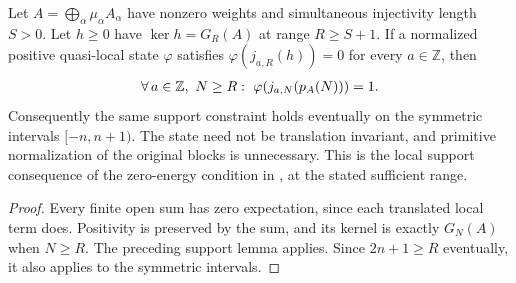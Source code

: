 \begin{lemma}
    \label{thm:quasi_local_parent_zero_energy_joint_support}
    \leanok
    Let $A=\bigoplus_\alpha\mu_\alpha A_\alpha$ have nonzero weights and
    simultaneous injectivity length $S>0$. Let $h\geq0$ have
    $\ker h=G_R(A)$ at range $R\geq S+1$.
    If a normalized positive quasi-local state $\varphi$ satisfies
    $\varphi(j_{a,R}(h))=0$ for every $a\in\mathbb Z$, then
    \begin{align}
        \forall\,a\in\mathbb Z,\ N\geq R:\ \varphi(j_{a,N}(p_A(N)))=1.
        \notag
    \end{align}
    Consequently the same support constraint holds eventually on the
    symmetric intervals $[-n,n+1)$. The state need not be translation
    invariant, and primitive normalization of the original blocks is
    unnecessary. This is the local support consequence of the zero-energy
    condition in \cite[Theorem~1.1]{Nachtergaele1996Spectral}, at the stated
    sufficient range.
\end{lemma}
\begin{proof}\leanok
    Every finite open sum has zero expectation, since each translated local
    term does. Positivity is preserved by the sum, and its kernel is exactly
    $G_N(A)$ when $N\geq R$. The preceding support lemma applies.
    Since $2n+1\geq R$ eventually, it also applies to the symmetric intervals.
\end{proof}

